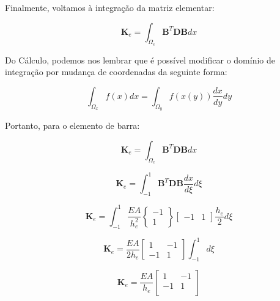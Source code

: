        Finalmente, voltamos à integração da matriz elementar:

       \begin{equation*}
            \mathbf{K}_e = \int_{\Omega_e} \mathbf{B}^T \mathbf{D} \mathbf{B} dx
        \end{equation*}

        Do Cálculo, podemos nos lembrar que é possível modificar o domínio de integração por mudança de coordenadas da seguinte forma:

        \begin{equation*}
            \int_{\Omega_x} f(x) dx = \int_{\Omega_y} f(x(y)) \frac{dx}{dy} dy
        \end{equation*}


        Portanto, para o elemento de barra:

        \begin{equation*}
            \mathbf{K}_e = \int_{\Omega_e} \mathbf{B}^T \mathbf{D} \mathbf{B} dx
        \end{equation*}


        \begin{equation*}
            \mathbf{K}_e = \int_{-1}^1 \mathbf{B}^T \mathbf{D} \mathbf{B} \frac{dx}{d\xi} d\xi
        \end{equation*}


        \begin{equation*}
            \mathbf{K}_e = \int_{-1}^1 \frac{EA}{h_e^2}
            \begin{Bmatrix}
            -1 \\
            1
            \end{Bmatrix}
            \begin{bmatrix}
            -1 &
            1
            \end{bmatrix} \frac{h_e}{2} d\xi
        \end{equation*}

        \begin{equation*}
            \mathbf{K}_e =  \frac{EA}{2h_e}
            \begin{bmatrix}
             1 & -1\\
            -1 &  1
            \end{bmatrix} \int_{-1}^1 d\xi
        \end{equation*}

        \begin{equation*}
            \mathbf{K}_e = 
            \frac{EA}{h_e}
            \begin{bmatrix}
                1 & -1 \\
                -1 & 1 \\
            \end{bmatrix}
        \end{equation*}

